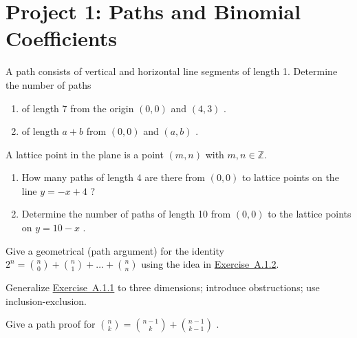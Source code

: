 \documentclass[10pt,]{book}
\theoremstyle{plain}
\theoremstyle{definition}
\theoremstyle{definition}
\theoremstyle{definition}
\theoremstyle{definition}
\numberwithin{equation}{chapter}
\def\Z{\mathbb Z}
\begin{document}
\section[{Project 1: Paths and Binomial Coefficients}]{Project 1: Paths and Binomial Coefficients}\label{exercises-11}
\begin{divisionexercise}{1}\hypertarget{ex-count-paths}{}
\hypertarget{p-1266}{}%
A path consists of vertical and horizontal line segments of length 1. Determine the number of paths \leavevmode%
\begin{enumerate}[label=(\alph*)]
\item\hypertarget{li-242}{}\hypertarget{p-1267}{}%
of length 7 from the origin \(\left( 0,0 \right)\) and \((4,3)\) .%
\item\hypertarget{li-243}{}\hypertarget{p-1268}{}%
of length \(a + b\) from \(\left( 0,0 \right)\) and \((a,b)\) .%
\end{enumerate}
%
\end{divisionexercise}%
\begin{divisionexercise}{2}\hypertarget{ex-paths-on-lines}{}
\hypertarget{p-1269}{}%
A lattice point in the plane is a point \((m,n)\) with \(m,n \in \Z\). \leavevmode%
\begin{enumerate}[label=(\alph*)]
\item\hypertarget{li-244}{}\hypertarget{p-1270}{}%
How many paths of length 4 are there from \((0,0)\) to lattice points on the line \(y = - x + 4\) ?%
\item\hypertarget{li-245}{}\hypertarget{p-1271}{}%
Determine the number of paths of length 10 from \((0,0)\) to the lattice points on \(y = 10 - x\) .%
\end{enumerate}
%
\end{divisionexercise}%
\begin{divisionexercise}{3}\hypertarget{exercise-124}{}
\hypertarget{p-1272}{}%
Give a geometrical (path argument) for the identity \(2^{n} =
\binom{n}{0}
+
\binom{n}{1}
+ \ldots +
\binom{n}{n}\) using the idea in \hyperlink{ex-paths-on-lines}{Exercise~A.1.2}.%
\end{divisionexercise}%
\begin{divisionexercise}{4}\hypertarget{exercise-125}{}
\hypertarget{p-1273}{}%
Generalize \hyperlink{ex-count-paths}{Exercise~A.1.1} to three dimensions; introduce obstructions; use inclusion-exclusion.%
\end{divisionexercise}%
\begin{divisionexercise}{5}\hypertarget{exercise-126}{}
\hypertarget{p-1274}{}%
Give a path proof for \(\binom{n}{k}
=
\binom{n - 1}{k}
+
\binom{n - 1}{k - 1}\) .%
\end{divisionexercise}%
\end{document}

